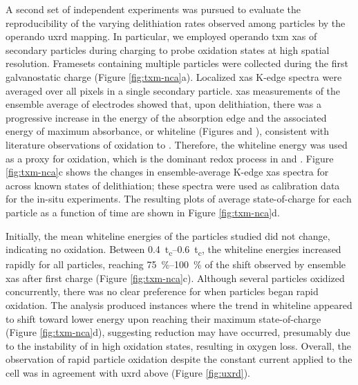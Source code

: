 \documentclass{article}
\begin{document}


A second set of independent experiments was pursued to evaluate the
reproducibility of the varying delithiation rates observed among
particles by the operando \gls{uxrd} mapping. In particular, we
employed operando \Gls{txm} \gls{xas} of \nca{} secondary particles
during charging to probe  oxidation states at high spatial
resolution. Framesets containing multiple particles were collected
during the first galvanostatic charge (Figure
\ref{fig:txm-nca}a). Localized \gls{xas} K-edge spectra were averaged
over all pixels in a single secondary particle. \gls{xas} measurements
of the ensemble average of electrodes showed that, upon delithiation,
there was a progressive increase in the energy of the absorption edge
and the associated energy of maximum absorbance, or whiteline (Figures
 and ), consistent
with literature observations of  oxidation to
\cite{deb2005,muto2009}. Therefore, the whiteline energy
was used as a proxy for  oxidation, which is the dominant redox
process in \nca{} and \nmc{}. Figure \ref{fig:txm-nca}c shows the
changes in ensemble-average  K-edge \gls{xas} spectra for
\nca{} across known states of delithiation; these spectra were used as
calibration data for the in-situ experiments. The resulting plots of
average state-of-charge for each particle as a function of time are
shown in Figure \ref{fig:txm-nca}d.

Initially, the mean whiteline energies of the particles studied did
not change, indicating no  oxidation. Between
\SIrange{0.4}{0.6}{t_c}, the whiteline energies increased rapidly for
all particles, reaching \SIrange{75}{100}{\percent} of the shift
observed by ensemble \gls{xas} after first charge (Figure
\ref{fig:txm-nca}c). Although several particles oxidized concurrently,
there was no clear preference for when particles began rapid
oxidation. The analysis produced instances where the trend in
whiteline appeared to shift toward lower energy upon reaching their
maximum state-of-charge (Figure \ref{fig:txm-nca}d), suggesting
 reduction may have occurred, presumably due to the instability
of  in high oxidation states\cite{myung2020-2}, resulting in
oxygen loss. Overall, the observation of rapid particle oxidation
despite the constant current applied to the cell was in agreement with
\gls{uxrd} above (Figure \ref{fig:uxrd}).
\end{document}
